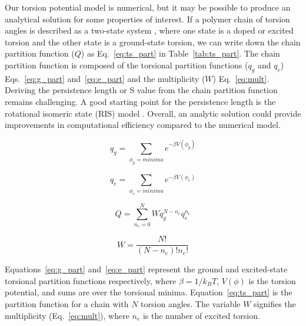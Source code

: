 \begin{itemize}
  Our torsion potential model is numerical, but it may be possible to produce an analytical solution for some properties of interest. If a polymer chain of torsion angles is described as a two-state system \cite{ucb.b1828986320110101}, where one state is a doped or excited torsion and the other state is a ground-state torsion, we can write down the chain partition function ($Q$) as Eq.~\ref{eq:ts_part} in Table~\ref{tab:ts_part}. The chain partition function is composed of the torsional partition functions ($q_g$ and $q_e$) Eqs.~\ref{eq:g_part} and~\ref{eq:e_part} and the multiplicity ($W$) Eq.~\ref{eq:mult}. Deriving the persistence length or S value from the chain partition function remains challenging. A good starting point for the persistence length is the rotational isomeric state (RIS) model \cite{Flory1989}. Overall, an analytic solution could provide improvements in computational efficiency compared to the numerical model.

  \end{itemize}

  \clearpage

  \begin{table}[t!]
  \begin{multicols}{2}
  \begin{equation}
    q_{g} = \sum_{\phi_{g}=minima}^{}e^{-\beta V(\phi_{g})}
    \label{eq:g_part}
  \end{equation}

  \begin{equation}
    q_{e} = \sum_{\phi_{e}=minima}^{}e^{-\beta V(\phi_{e})}
    \label{eq:e_part}
  \end{equation}
\end{multicols}

\begin{multicols}{2}
\begin{equation}
  Q = \sum_{n_e=0}^{N}Wq_{g}^{N-n_e}q_{e}^{n_e}
  \label{eq:ts_part}
\end{equation}

\begin{equation}
  W = \frac{N!}{(N-n_e)!n_e!}
  \label{eq:mult}
\end{equation}
\end{multicols}
\caption[Two-state Partition Function]{Equations~\ref{eq:g_part} and~\ref{eq:e_part} represent the ground and excited-state torsional partition functions respectively, where $\beta = 1/k_BT$, $V(\phi)$ is the torsion potential, and sums are over the torsional minima. Equation~\ref{eq:ts_part} is the partition function for a chain with $N$ torsion angles. The variable $W$ signifies the multiplicity (Eq.~\ref{eq:mult}), where $n_e$ is the number of excited torsion.}
\label{tab:ts_part}
\end{table}

